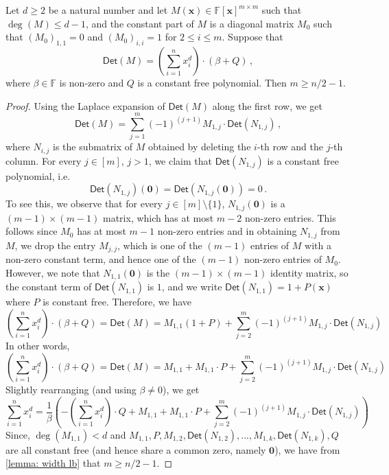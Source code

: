 \documentclass[10pt,a4paper]{article}
\newcommand{\F}{\mathbb{F}}
\newcommand{\vx}{\mathbf{x}}
\newcommand{\vzero}{\mathbf{0}}
\newcommand{\Det}{\mathsf{Det}}
\begin{document}
\begin{lemma}\label{lem: n/2 lb for higher deg entries}
Let $d \ge 2$ be a natural number and let $M(\vx) \in \F[\vx]^{m \times m}$ such that $\deg(M) \le d-1$, and the constant part of $M$ is a diagonal matrix $M_0$ such that $(M_0)_{1,1}=0$ and $(M_0)_{i,i}=1$ for $2 \le i \le m$.  Suppose that
\[
\Det(M) = \left(\sum_{i = 1}^n x_i^d\right) \cdot (\beta + Q) \, , 
\]
where $\beta \in \F$ is non-zero and $Q$ is a constant free polynomial. Then $m \geq n/2-1$. 
\end{lemma}
\begin{proof}
 Using the Laplace expansion of $\Det(M)$ along the first row, we get 
\[
\Det(M) = \sum_{j=1}^m (-1)^{(j + 1)}M_{1, j}\cdot \Det (N_{1, j}) \, ,
\]
where $N_{i, j}$ is the submatrix of $M$ obtained by deleting the $i$-th row and the $j$-th column. For every $j \in [m]$, $j > 1$, we claim that $\Det(N_{1, j})$ is a constant free polynomial, i.e. \[
\Det(N_{1, j})(\mathbf{0}) = \Det\left(N_{1, j}(\mathbf{0})\right) = 0 \, .
\] 
To see this, we observe that for every $j\in [m]\setminus \{1\}$, $N_{1, j}(\mathbf{0})$ is a $(m-1)\times (m-1)$ matrix, which has at most $m-2$ non-zero entries. This follows since $M_0$ has at most $m-1$ non-zero entries and in obtaining $N_{1, j}$ from $M$, we drop the entry $M_{j, j}$, which is one of the $(m-1)$ entries of $M$ with a non-zero constant term, and hence one of the $(m-1)$ non-zero entries of $M_0$. However, we note that $N_{1,1}(\vzero)$ is the $(m-1) \times (m-1)$ identity matrix, so the  constant term of $\Det(N_{1,1})$ is $1$, and we write  $\Det(N_{1,1}) = 1 + P(\vx)$ where $P$ is  constant free. Therefore, we have 
\[
\left(\sum_{i = 1}^n x_i^d\right)\cdot (\beta + Q) = \Det(M) = M_{1,1}(1 + P) + \sum_{j = 2}^m (-1)^{(j + 1)}M_{1, j}\cdot \Det(N_{1, j}) \, 
\]
In other words, 
\[
\left(\sum_{i = 1}^n x_i^d\right)\cdot (\beta + Q) = \Det(M) = M_{1,1} +  M_{1,1}\cdot P + \sum_{j = 2}^m (-1)^{(j + 1)}M_{1, j}\cdot \Det(N_{1, j}) \, 
\]
Slightly rearranging (and using $\beta \neq 0$), we get
\[
\sum_{i = 1}^n x_i^d = \frac{1}{\beta}\left(-\left(\sum_{i = 1}^n x_i^d\right)\cdot Q + M_{1,1} +  M_{1,1}\cdot P + \sum_{j = 2}^m (-1)^{(j + 1)}M_{1, j}\cdot \Det(N_{1, j})  \right)\, 
\]
Since, $\deg(M_{1,1}) < d$ and $M_{1,1}, P, M_{1, 2}, \Det(N_{1, 2}), \ldots, M_{1, k}, \Det(N_{1, k}), Q$ are all constant free (and hence share a common zero, namely $\mathbf{0}$), we have from \autoref{lemma: width lb} that $m \geq n/2-1$. 
\end{proof}
\end{document}
